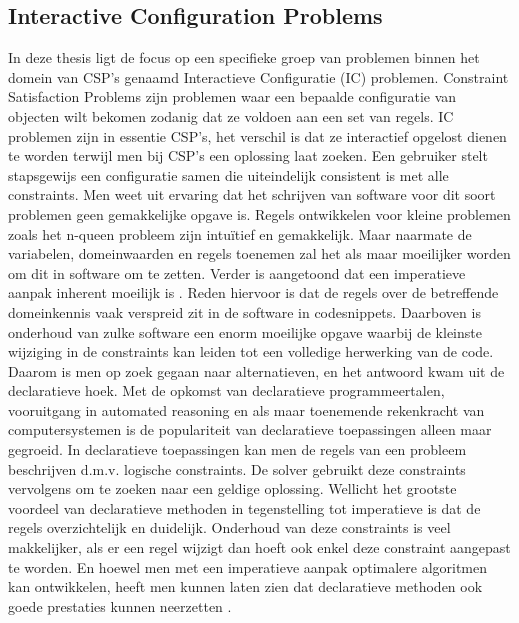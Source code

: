 \subsection{Interactive Configuration Problems}
In deze thesis ligt de focus op een specifieke groep van problemen binnen het domein van CSP's genaamd Interactieve Configuratie (IC) problemen. Constraint Satisfaction Problems zijn problemen waar een bepaalde configuratie van objecten wilt bekomen zodanig dat ze voldoen aan een set van regels. IC problemen zijn in essentie CSP's, het verschil is dat ze interactief opgelost dienen te worden terwijl men bij CSP's een oplossing laat zoeken. Een gebruiker stelt stapsgewijs een configuratie samen die uiteindelijk consistent is met alle constraints. Men weet uit ervaring dat het schrijven van software voor dit soort problemen geen gemakkelijke opgave is. Regels ontwikkelen voor kleine problemen zoals het n-queen probleem zijn intu\"{i}tief en gemakkelijk. Maar naarmate de variabelen, domeinwaarden en regels toenemen zal het als maar moeilijker worden om dit in software om te zetten. Verder is aangetoond dat een imperatieve aanpak inherent moeilijk is \citep{gelle1996interactive}. Reden hiervoor is dat de regels over de betreffende domeinkennis vaak verspreid zit in de software in codesnippets. Daarboven is onderhoud van zulke software een enorm moeilijke opgave waarbij de kleinste wijziging in de constraints kan leiden tot een volledige herwerking van de code. Daarom is men op zoek gegaan naar alternatieven, en het antwoord kwam uit de declaratieve hoek. Met de opkomst van declaratieve programmeertalen, vooruitgang in automated reasoning en als maar toenemende rekenkracht van computersystemen is de populariteit van declaratieve toepassingen alleen maar gegroeid. In declaratieve toepassingen kan men de regels van een probleem beschrijven d.m.v. logische constraints. De solver gebruikt deze constraints vervolgens om te zoeken naar een geldige oplossing. Wellicht het grootste voordeel van declaratieve methoden in tegenstelling tot imperatieve is dat de regels overzichtelijk en duidelijk. Onderhoud van deze constraints is veel makkelijker, als er een regel wijzigt dan hoeft ook enkel deze constraint aangepast te worden. En hoewel men met een imperatieve aanpak optimalere algoritmen kan ontwikkelen, heeft men kunnen laten zien dat declaratieve methoden ook goede prestaties kunnen neerzetten \citep{vlaeminck2009logical}. 

